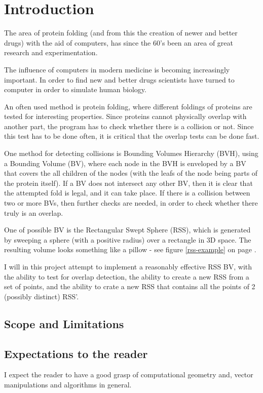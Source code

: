 
\section{Introduction}
\label{introduction}

The area of protein folding (and from this the creation of newer and better drugs) with the aid of computers, has since the 60's been an area of great research and experimentation. 


The influence of computers in modern medicine is becoming increasingly important. In order to find new and better drugs scientists have turned to computer in order to simulate human biology.

An often used method is protein folding, where different foldings of proteins are tested for interesting properties. Since proteins cannot physically overlap with another part, the program has to check whether there is a collision or not. Since this test has to be done often, it is critical that the overlap tests can be done fast. 

One method for detecting collisions is Bounding Volumes Hierarchy (BVH), using a Bounding Volume (BV), where each node in the BVH is enveloped by a BV that covers the all children of the nodes (with the leafs of the node being parts of the protein itself). If a BV does not intersect any other BV, then it is clear that the attempted fold is legal, and it can take place. If there is a collision between two or more BVs, then further checks are needed, in order to check whether there truly is an overlap.

One of possible BV is the Rectangular Swept Sphere (RSS), which is generated by sweeping a sphere (with a positive radius) over a rectangle in 3D space. The resulting volume looks something like a pillow - see figure \ref{rss-example} on page \pageref{rss-example}. 

I will in this project attempt to implement a reasonably effective RSS BV, with the ability to test for overlap detection, the ability to create a new RSS from a set of points, and the ability to crate a new RSS that contains all the points of 2 (possibly distinct) RSS'.

\subsection{Scope and Limitations}
\label{scope}

\subsection{Expectations to the reader}
 I expect the reader to have a good grasp of computational geometry and, vector manipulations and algorithms in general.


